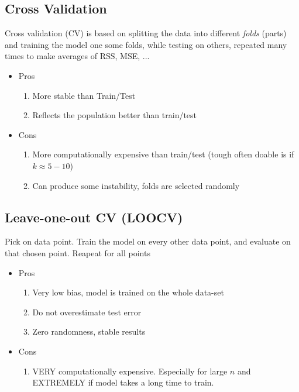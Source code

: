 \documentclass{article}
\begin{document}
\subsection{Cross Validation}
Cross validation (CV) is based on splitting the data into different \textit{folds} (parts) and training the model one some folds, while testing on others, repeated many times to make averages of RSS, MSE, ... 

\begin{itemize}
    \item Pros
    \begin{enumerate}
        \item More stable than Train/Test
        \item Reflects the population better than train/test
    \end{enumerate}
    
    \item Cons
    \begin{enumerate}
        \item More computationally expensive than train/test (tough often doable is if $k \approx 5-10$)
        \item Can produce some instability, folds are selected randomly 
    \end{enumerate}
\end{itemize}

\subsection{Leave-one-out CV (LOOCV)}
Pick on data point. Train the model on every other data point, and evaluate on that chosen point. Reapeat for all points

\begin{itemize}
    \item Pros
    \begin{enumerate}
        \item Very low bias, model is trained on the whole data-set
        \item Do not overestimate test error
        \item Zero randomness, stable results
    \end{enumerate}
    \item Cons
        \begin{enumerate}
            \item VERY computationally expensive. Especially for large $n$ and EXTREMELY if model takes a long time to train. 
        \end{enumerate}
\end{itemize}
\end{document}
